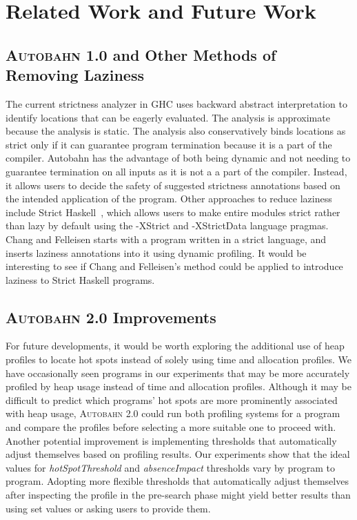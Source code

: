 \documentclass[format=sigplan, review=true]{acmart}
\newcommand{\hotspots}[0]{hot spots}
\newcommand{\hotspotcost}[0]{\textit{hotSpotThreshold}}
\newcommand{\Ao}[0]{\textsc{Autobahn 1.0}}
\newcommand{\At}[0]{\textsc{Autobahn 2.0}}
\newcommand{\preopt}[0]{pre-search}
\newcommand{\absim}[0]{\textit{absenceImpact}}
\begin{document}
\section{Related Work and Future Work}

\subsection{\Ao{} and Other Methods of Removing Laziness}

The current strictness analyzer in GHC uses backward abstract
interpretation to identify locations that can be eagerly
evaluated. The analysis is approximate because the analysis is
static. The analysis also conservatively binds locations as strict
only if it can guarantee program termination because it is a part of
the compiler. Autobahn has the advantage of both being dynamic and not
needing to guarantee termination on all inputs as it is not a a part
of the compiler. Instead, it allows users to decide the safety of
suggested strictness annotations based on the intended application of
the program. Other approaches to reduce laziness include Strict
Haskell~\cite{strict-haskell}, which allows users to make entire modules strict rather than
lazy by default using the -XStrict and -XStrictData language
pragmas. Chang and Felleisen starts with a program written in a strict
language, and inserts laziness annotations into it using dynamic
profiling. It would be interesting to see if Chang and Felleisen's
method could be applied to introduce laziness to Strict Haskell
programs.

\subsection{\At{} Improvements}
For future developments, it would be worth exploring the additional use of heap profiles to locate hot spots instead of solely using time and allocation profiles. We have occasionally seen programs in our experiments that may be more accurately profiled by heap usage instead of time and allocation profiles. Although it may be difficult to predict which programs' \hotspots{} are more prominently associated with heap usage, \At{} could run both profiling systems for a program and compare the profiles before selecting a more suitable one to proceed with. Another potential improvement is implementing thresholds that automatically adjust themselves based on profiling results. Our experiments show that the ideal values for \hotspotcost{} and \absim{} thresholds vary by program to program. Adopting more flexible thresholds that automatically adjust themselves after inspecting the profile in the \preopt{} phase might yield better results than using set values or asking users to provide them.
\end{document}
